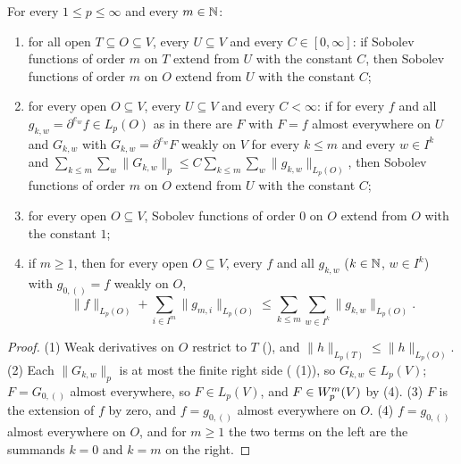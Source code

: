 \begin{lemma}
\label{lem:extends-sobolev-order}
\leanok
{}
For every $1 \leq p \leq \infty$ and every $m \in \mathbb{N}$:
\begin{enumerate}
  \item for all open $T \subseteq O \subseteq V$, every $U \subseteq V$ and every
    $C \in [0, \infty]$: if Sobolev functions of order $m$ on $T$ extend from $U$ with the
    constant $C$, then Sobolev functions of order $m$ on $O$ extend from $U$ with the
    constant $C$;
  \item for every open $O \subseteq V$, every $U \subseteq V$ and every $C < \infty$: if for
    every $f$ and all $g_{k,w} = \partial^{e_w} f \in L_p(O)$ as in
     there are $F$ with $F = f$ almost everywhere on $U$ and
    $G_{k,w}$ with $G_{k,w} = \partial^{e_w} F$ weakly on $V$ for every $k \leq m$ and every
    $w \in I^k$ and
    $\sum_{k \leq m} \sum_w \|G_{k,w}\|_p \leq C \sum_{k \leq m} \sum_w \|g_{k,w}\|_{L_p(O)}$,
    then Sobolev functions of order $m$ on $O$ extend from $U$ with the constant $C$;
  \item for every open $O \subseteq V$, Sobolev functions of order $0$ on $O$ extend from $O$
    with the constant $1$;
  \item if $m \geq 1$, then for every open $O \subseteq V$, every $f$ and all $g_{k,w}$
    ($k \in \mathbb{N}$, $w \in I^k$) with $g_{0,()} = f$ weakly on $O$,
    \[
      \|f\|_{L_p(O)} + \sum_{i \in I^m} \|g_{m,i}\|_{L_p(O)} \leq \sum_{k \leq m}
      \sum_{w \in I^k} \|g_{k,w}\|_{L_p(O)} .
    \]
\end{enumerate}
\end{lemma}

\begin{proof}
\leanok
(1) Weak derivatives on $O$ restrict to $T$ (), and
$\|h\|_{L_p(T)} \leq \|h\|_{L_p(O)}$. (2) Each $\|G_{k,w}\|_p$ is at most the finite right side
( (1)), so $G_{k,w} \in L_p(V)$; $F = G_{0,()}$ almost everywhere, so
$F \in L_p(V)$, and $F \in W^{m}_{p}(V)$ by  (4). (3) $F$ is
the extension of $f$ by zero, and $f = g_{0,()}$ almost everywhere on $O$. (4) $f = g_{0,()}$
almost everywhere on $O$, and for $m \geq 1$ the two terms on the left are the summands $k = 0$
and $k = m$ on the right.
\end{proof}

